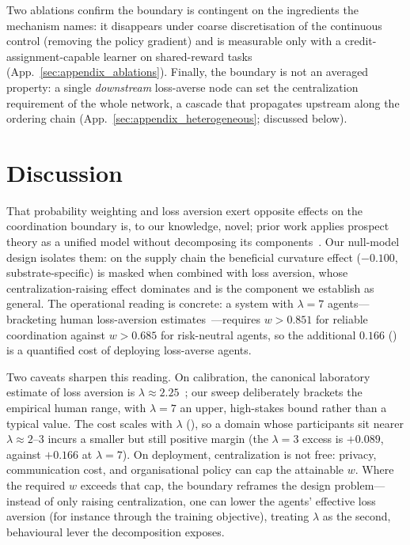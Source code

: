\documentclass[letterpaper]{article}
\theoremstyle{plain}
\begin{document}
Two ablations confirm the boundary is contingent on the ingredients the
mechanism names: it disappears under coarse discretisation of the continuous
control (removing the policy gradient) and is measurable only with a
credit-assignment-capable learner on shared-reward tasks
(App.~\ref{sec:appendix_ablations}). Finally, the boundary is not an averaged
property: a single \emph{downstream} loss-averse node can set the centralization
requirement of the whole network, a cascade that propagates upstream along the
ordering chain (App.~\ref{sec:appendix_heterogeneous}; discussed below).
\section{Discussion}
\label{sec:discussion}

That probability weighting and loss aversion exert opposite effects on the
coordination boundary is, to our knowledge, novel; prior work applies prospect
theory as a unified model without decomposing its
components~\citep{lalmohammed2025,ghaemi2024risk}. Our null-model design isolates
them: on the supply chain the beneficial curvature effect ($-0.100$,
substrate-specific) is masked when combined with loss aversion, whose
centralization-raising effect dominates and is the component we establish as
general. The operational reading is concrete: a system with $\lambda{=}7$
agents---bracketing human loss-aversion estimates~\citep{tversky1992}---requires
$w>0.851$ for reliable coordination against $w>0.685$ for risk-neutral agents,
so the additional $0.166$ () is a quantified cost of
deploying loss-averse agents.

Two caveats sharpen this reading. On calibration, the canonical laboratory
estimate of loss aversion is $\lambda\approx2.25$~\citep{tversky1992}; our
sweep deliberately brackets the empirical human range, with $\lambda{=}7$ an
upper, high-stakes bound rather than a typical value. The cost scales with
$\lambda$ (), so a domain whose participants sit nearer
$\lambda\approx2$--$3$ incurs a smaller but still positive margin (the
$\lambda{=}3$ excess is $+0.089$, against $+0.166$ at $\lambda{=}7$). On
deployment, centralization is not free: privacy, communication cost, and
organisational policy can cap the attainable $w$. Where the required $w$
exceeds that cap, the boundary reframes the design problem---instead of only
raising centralization, one can lower the agents' effective loss aversion
(for instance through the training objective), treating $\lambda$ as the
second, behavioural lever the decomposition exposes.
\end{document}
